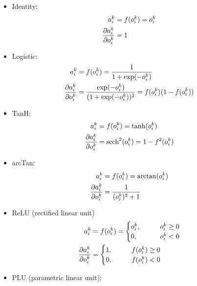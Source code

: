\documentclass[12pt,notitlepage]{article}
\begin{document}
\begin{itemize}
\item Identity:
  \begin{align}
    \label{eq:identity}
    a_{i}^{k} &= f(o_{i}^{k}) = o_{i}^{k}\\
    \frac{\partial a_{i}^{k}}{\partial o_{i}^{k}} &= 1
  \end{align}
\item Logistic:
  \begin{align}
    \label{eq:logistic-fun}
    a_{i}^{k} &= f(o_{i}^{k}) = \frac{1}{1+\exp(-o_{i}^{k})}\\
    \frac{\partial a_{i}^{k}}{\partial o_{i}^{k}} &=
                                    \frac{\exp(-o_{i}^{k})}{(1+\exp(-o_{i}^{k}))^{2}}
                                    = f(o_{i}^{k})(1-f(o_{i}^{k}))
  \end{align}
\item TanH:
  \begin{align}
    \label{eq:tanh-fun}
    a_{i}^{k} &= f(o_{i}^{k}) = \tanh(o_{i}^{k})\\
    \frac{\partial a_{i}^{k}}{\partial o_{i}^{k}} &= \operatorname{sech}^{2}(o_{i}^{k}) = 1 - f^{2}(o_{i}^{k})
  \end{align}
\item arcTan:
  \begin{align}
    \label{eq:arctan-fun}
    a_{i}^{k} &= f(o_{i}^{k}) = \arctan(o_{i}^{k})\\
    \frac{\partial a_{i}^{k}}{\partial o_{i}^{k}} &= \frac{1}{(o_{i}^{k})^{2}+1}
  \end{align}
\item ReLU (rectified linear unit)
  \begin{align}
    \label{eq:relu-fun}
    a_{i}^{k} &= f(o_{i}^{k}) =
                \begin{cases}
                  o_{i}^{k}, \qquad & o_{i}^{k} \ge 0\\
                  0, \qquad & o_{i}^{k} < 0
                \end{cases}\\
    \frac{\partial a_{i}^{k}}{\partial o_{i}^{k}} &=
                                    \begin{cases}
                                      1, \qquad & f(o_{i}^{k}) \ge 0\\
                                      0, \qquad & f(o_{i}^{k}) < 0
                                    \end{cases}
  \end{align}
\item PLU (parametric linear unit):
  \begin{align}

\end{align}
\end{itemize}
\end{document}
